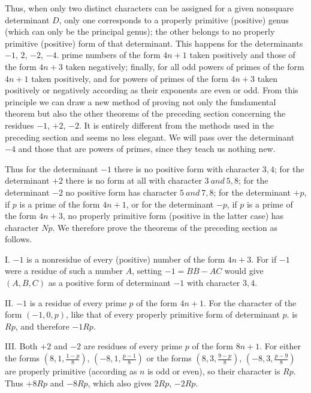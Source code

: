 Thus, when only two distinct characters can be assigned for a given nonsquare determinant $D$, only one corresponds to a properly primitive (positive) genus (which can only be the principal genus); the other belongs to no properly primitive (positive) form of that determinant. This happens for the determinants $-1$, $2$, $-2$, $-4$. prime numbers of the form $4n+1$ taken positively and those of the form $4n+3$ taken negatively; finally, for all odd powers of primes of the form $4n+1$ taken positively, and for powers of primes of the form $4n+3$ taken positively or negatively according as their exponents are even or odd. From this principle we can draw a new method of proving not only the fundamental theorem but also the other theorems of the preceding section concerning the residues $-1$, $+2$, $-2$. It is entirely different from the methods used in the
preceding section and seems no less elegant. We will pass over the determinant $-4$ and those that are powers of primes, since they teach us nothing new.

Thus for the determinant $-1$ there is no positive form with character $3,4$; for the determinant $+2$ there is no form at all with character $3\ \mathit{and}\ 5,8$; for the determinant $-2$ no positive form has character $5\ \mathit{and}\ 7,8$; for the determinant $+p$, if $p$ is a prime of the form $4n+1$, or for the determinant $-p$, if $p$ is a prime of the form $4n+3$, no properly primitive form (positive in the latter case) has character $Np$. We therefore prove the theorems of the preceding section as follows.

I. $-1$ is a nonresidue of every (positive) number of the form $4n+3$. For if $-1$ were a residue of such a number $A$, setting $-1=BB-AC$ would give $(A,B,C)$ as a positive form of determinant $-1$ with character $3,4$.

II. $-1$ is a residue of every prime $p$ of the form $4n+1$. For the character of the form $(-1,0,p)$, like that of every properly primitive form of determinant $p$. is $Rp$, and therefore $-1Rp$.

III. Both $+2$ and $-2$ are residues of every prime $p$ of the form $8n+1$. For either the forms $\left(8,\allowbreak 1,\allowbreak \frac{1-p}{8}\right)$, $\left(-8,\allowbreak 1,\allowbreak \frac{p-1}{8}\right)$ or the forms $\left(8,\allowbreak 3,\allowbreak \frac{9-p}{8}\right)$, $\left(-8,\allowbreak 3,\allowbreak \frac{p-9}{8}\right)$ are properly primitive (according as $n$ is odd or even), so their character is $Rp$. Thus $+8Rp$ and $-8Rp$, which also gives $2Rp$, $-2Rp$.


